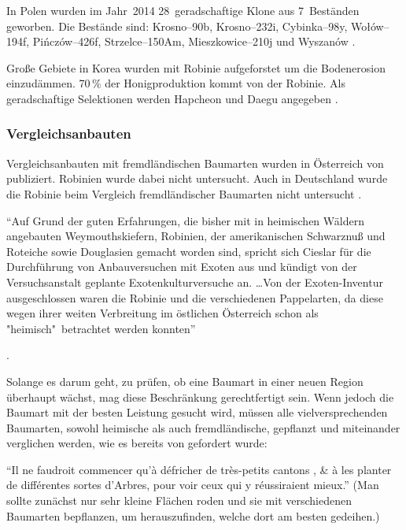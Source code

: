 \documentclass[twocolumn]{scrartcl}
\begin{document}
In Polen wurden im Jahr~2014 28~geradschaftige Klone aus 7~Beständen
geworben. Die Bestände sind: Krosno--90b, Krosno--232i, Cybinka--98y,
Wołów--194f, Pińczów--426f, Strzelce--150Am, Mieszkowice--210j und
Wyszanów \citep{wojda2015robiniePolen}.

Große Gebiete in Korea wurden mit Robinie aufgeforstet um die
Bodenerosion einzudämmen. 70\,\% der Honigproduktion kommt von der
Robinie. Als geradschaftige Selektionen werden Hapcheon und Daegu
angegeben \citep{lee2007robinieKorea}.

\subsubsection{Vergleichsanbauten}

Vergleichsanbauten mit fremdländischen Baumarten wurden in Österreich
von \citet{cieslar1901fremdlaendischeHolzarten} publiziert. Robinien
wurde dabei nicht untersucht. Auch in Deutschland wurde die Robinie
beim Vergleich fremdländischer Baumarten nicht untersucht
\citep{schwappach1901fremdlaendischeHolzarten}.

\hypertarget{german:rannert1979fremdlaendischeBaumarten}{\enquote{Auf Grund der guten Erfahrungen, die bisher mit in heimischen
  Wäldern angebauten Weymouthskiefern, Robinien, der amerikanischen
  Schwarznuß und Roteiche sowie Douglasien gemacht worden sind,
  spricht sich Cieslar für die Durchführung von Anbauversuchen mit
  Exoten aus und kündigt von der Versuchsanstalt geplante
  Exotenkulturversuche an. \dots Von der Exoten-Inventur
  ausgeschlossen waren die Robinie und die verschiedenen Pappelarten,
  da diese wegen ihrer weiten Verbreitung im östlichen Österreich
  schon als "heimisch"\ betrachtet werden konnten}}
\citep{rannert1979fremdlaendischeBaumarten}.

Solange es darum geht, zu prüfen, ob eine Baumart in einer neuen
Region überhaupt wächst, mag diese Beschränkung gerechtfertigt sein.
Wenn jedoch die Baumart mit der besten Leistung gesucht wird, müssen
alle vielversprechenden Baumarten, sowohl heimische als auch
fremdländische, gepflanzt und miteinander verglichen werden, wie es
bereits von \citet[S.~300]{reaumur1721ertragstafel} gefordert wurde:

\enquote{Il ne faudroit commencer qu’à défricher de très-petits cantons , \& à les planter de différentes sortes d'Arbres, pour voir ceux qui y réussiraient mieux.} (Man sollte zunächst nur sehr kleine Flächen roden und sie mit verschiedenen Baumarten bepflanzen, um herauszufinden, welche dort am besten gedeihen.)
\end{document}
